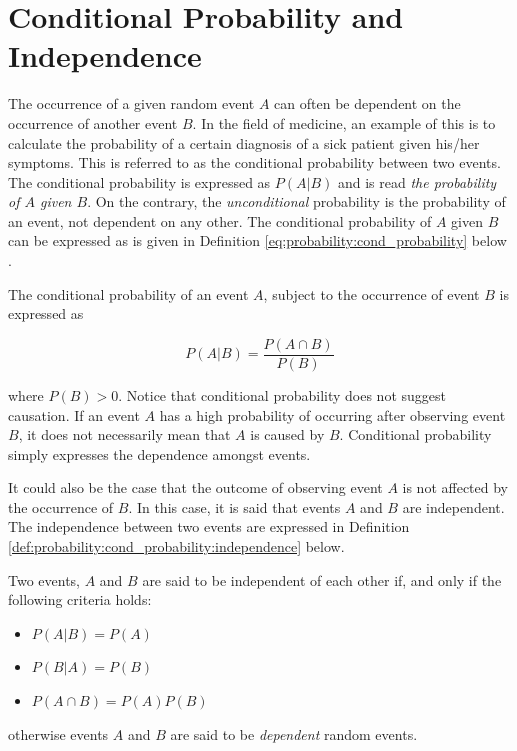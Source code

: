 \section{Conditional Probability and Independence}
\label{sec:probability:cond_probability}

The occurrence of a given random event $A$ can often be dependent on the occurrence of another event $B$. In the field of medicine, an example of this is to calculate the probability of a certain diagnosis of a sick patient given his/her symptoms. This is referred to as the conditional probability between two events. The conditional probability is expressed as $P(A \vert B)$ and is read \textit{the probability of $A$ given $B$}. On the contrary, the \textit{unconditional} probability is the probability of an event, not dependent on any other. The conditional probability of $A$ given $B$ can be expressed as is given in Definition \ref{eq:probability:cond_probability} below \cite{ref:wackerly:2014}.

\begin{definition}
    \label{eq:probability:cond_probability}
    The conditional probability of an event $A$, subject to the occurrence of event $B$ is expressed as
    
    \begin{equation*}
        P(A \vert B) = \frac{P(A \cap B)}{P(B)}
    \end{equation*}
\end{definition}

where $P(B) > 0$. Notice that conditional probability does not suggest causation. If an event $A$ has a high probability of occurring after observing event $B$, it does not necessarily mean that $A$ is caused by $B$. Conditional probability simply expresses the dependence amongst events. 

It could also be the case that the outcome of observing event $A$ is not affected by the occurrence of $B$. In this case, it is said that events $A$ and $B$ are independent. The independence between two events are expressed in Definition \ref{def:probability:cond_probability:independence} below.

\begin{definition}
    \label{def:probability:cond_probability:independence}
    Two events, $A$ and $B$ are said to be independent of each other if, and only if the following criteria holds:
    
    \begin{itemize}
        \item $P(A \vert B) = P(A)$
        \item $P(B \vert A) = P(B)$
        \item $P(A \cap B) = P(A)P(B)$
    \end{itemize}
    
    otherwise events $A$ and $B$ are said to be \textit{dependent} random events.
\end{definition}

